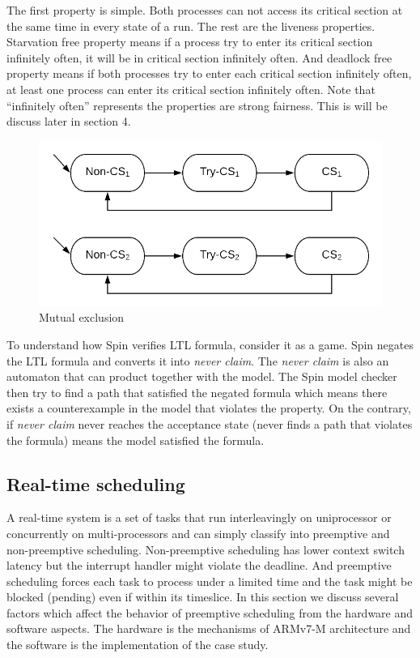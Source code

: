 The first property is simple. Both processes can not access its critical section at the same time in every state of a run. The rest are the liveness properties. Starvation free property means if a process try to enter its critical section infinitely often, it will be in critical section infinitely often. And deadlock free property means if both processes try to enter each critical section infinitely often, at least one process can enter its critical section infinitely often. Note that ``infinitely often'' represents the properties are strong fairness. This is will be discuss later in section 4.

\begin{figure}
\includegraphics[width=0.7\linewidth]{img/mutex}
\caption{Mutual exclusion}
\label{fig:mutex}
\end{figure}

To understand how Spin verifies LTL formula, consider it as a game. Spin negates the LTL formula and converts it into \textit{never claim}. The \textit{never claim} is also an automaton that can product together with the model. The Spin model checker then try to find a path that satisfied the negated formula which means there exists a counterexample in the model that violates the property. On the contrary, if \textit{never claim} never reaches the acceptance state (never finds a path that violates the formula) means the model satisfied the formula.

\subsection{Real-time scheduling}
A real-time system is a set of tasks that run interleavingly on uniprocessor or concurrently on multi-processors and can simply classify into preemptive and non-preemptive scheduling. Non-preemptive scheduling has lower context switch latency but the interrupt handler might violate the deadline. And preemptive scheduling forces each task to process under a limited time and the task might be blocked (pending) even if within its timeslice. In this section we discuss several factors which affect the behavior of preemptive scheduling from the hardware and software aspects. The hardware is the mechanisms of ARMv7-M architecture and the software is the implementation of the case study.

